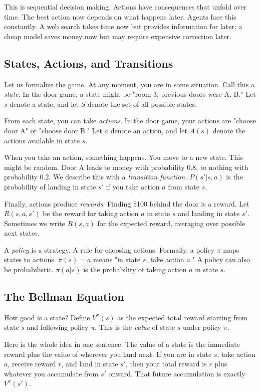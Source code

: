 This is sequential decision making. Actions have consequences that unfold over time. The best action now depends on what happens later. Agents face this constantly. A web search takes time now but provides information for later; a cheap model saves money now but may require expensive correction later.

\subsection{States, Actions, and Transitions}

Let us formalize the game. At any moment, you are in some situation. Call this a \textit{state}. In the door game, a state might be "room 3, previous doors were A, B." Let $s$ denote a state, and let $S$ denote the set of all possible states.

From each state, you can take \textit{actions}. In the door game, your actions are "choose door A" or "choose door B." Let $a$ denote an action, and let $A(s)$ denote the actions available in state $s$.

When you take an action, something happens. You move to a new state. This might be random. Door A leads to money with probability 0.8, to nothing with probability 0.2. We describe this with a \textit{transition function.} $P(s' | s, a)$ is the probability of landing in state $s'$ if you take action $a$ from state $s$.

Finally, actions produce \textit{rewards}. Finding \$100 behind the door is a reward. Let $R(s, a, s')$ be the reward for taking action $a$ in state $s$ and landing in state $s'$. Sometimes we write $R(s, a)$ for the expected reward, averaging over possible next states.

A \textit{policy} is a strategy. A rule for choosing actions. Formally, a policy $\pi$ maps states to actions. $\pi(s) = a$ means "in state $s$, take action $a$." A policy can also be probabilistic. $\pi(a|s)$ is the probability of taking action $a$ in state $s$.

\subsection{The Bellman Equation}

How good is a state? Define $V^\pi(s)$ as the expected total reward starting from state $s$ and following policy $\pi$. This is the \textit{value} of state $s$ under policy $\pi$.

Here is the whole idea in one sentence. The value of a state is the immediate reward plus the value of wherever you land next. If you are in state $s$, take action $a$, receive reward $r$, and land in state $s'$, then your total reward is $r$ plus whatever you accumulate from $s'$ onward. That future accumulation is exactly $V^\pi(s')$.

